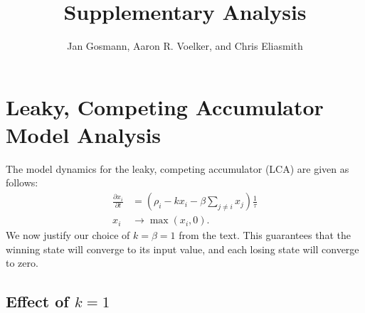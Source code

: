 \documentclass[a4paper]{article}
\title{Supplementary Analysis}
\author{Jan Gosmann, Aaron R. Voelker, and Chris Eliasmith}
\begin{document}
\maketitle


\section{Leaky, Competing Accumulator Model Analysis}

The model dynamics for the leaky, competing accumulator (LCA) are given as follows:
\begin{equation}
    \begin{split}
        \frac{{\partial x}_i}{\partial t} &= \left(\rho_i - kx_i - \beta \sum_{j \neq i} x_j\right) \frac{1}{\tau} \\
        x_i &\rightarrow \max(x_i, 0) .
    \end{split}
\end{equation}
We now justify our choice of $k = \beta = 1$ from the text.
This guarantees that the winning state will converge to its input value, and each losing state will converge to zero.

\subsection{Effect of $k = 1$}
\end{document}
